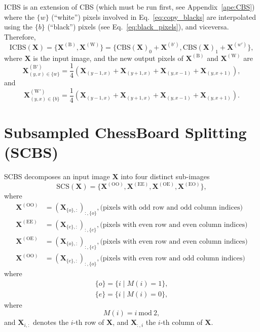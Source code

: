 \documentclass{article}
\begin{document}
ICBS is an extension of CBS (which must be run first, see
Appendix~\ref{ape:CBS}) where the $\{w\}$ (``white'') pixels involved
in Eq.~\ref{eq:copy_blacks} are interpolated using the $\{b\}$
(``black'') pixels (see Eq.~\ref{eq:black_pixels}), and
viceversa. Therefore,
\begin{equation}
  \mathrm{ICBS}(\mathbf{X})=\{\mathbf{X}^{(\text{B})},\mathbf{X}^{(\text{W})}\}=\{\text{CBS}(\mathbf{X})_0 + \mathbf{X}^{(b')},\text{CBS}(\mathbf{X})_1 + \mathbf{X}^{(w')}\},
\end{equation}
where $\mathbf{X}$ is the input image, and the new output pixels of
$\mathbf{X}^{(\text{B})}$ and $\mathbf{X}^{(\text{W})}$ are
\begin{equation}
  \mathbf{X}^{(\text{B}')}_{(y,x)\in\{w\}} = \frac{1}{4}(\mathbf{X}_{(y-1,x)}+\mathbf{X}_{(y+1,x)}+\mathbf{X}_{(y,x-1)}+\mathbf{X}_{(y,x+1)}),
\end{equation}
and
\begin{equation}
  \mathbf{X}^{(\text{W}')}_{(y,x)\in\{b\}} = \frac{1}{4}(\mathbf{X}_{(y-1,x)}+\mathbf{X}_{(y+1,x)}+\mathbf{X}_{(y,x-1)}+\mathbf{X}_{(y,x+1)}).
\end{equation}


\section{Subsampled ChessBoard Splitting (SCBS)}
\label{ape:SCBS}

SCBS \cite{koho2019fourier} decomposes an input image $\mathbf{X}$
into four distinct sub-images
\begin{equation}
  \mathrm{SCS}(\mathbf{X}) = \{\mathbf{X}^{(\text{OO})}, \mathbf{X}^{(\text{EE})}, \mathbf{X}^{(\text{OE})}, \mathbf{X}^{(\text{EO})} \},
\end{equation}
where
\begin{align}
  \mathbf{X}^{(\text{OO})} & = (\mathbf{X}_{\{o\},:})_{:,\{o\}}, \text{(pixels with odd row and odd column indices)} \\
  \mathbf{X}^{(\text{EE})} & = (\mathbf{X}_{\{e\},:})_{:,\{e\}}, \text{(pixels with even row and even column indices)}\\
  \mathbf{X}^{(\text{OE})} & = (\mathbf{X}_{\{o\},:})_{:,\{e\}}, \text{(pixels with even row and even column indices)}\\
  \mathbf{X}^{(\text{OO})} & = (\mathbf{X}_{\{e\},:})_{:,\{o\}}, \text{(pixels with even row and odd column indices)}
\end{align}
where
\begin{align}
  \{o\} = \{i\mid M(i)=1\}, \\
  \{e\} = \{i\mid M(i)=0\},
\end{align}
where
\begin{equation}
  M(i) = i~\text{mod}~2,
\end{equation}
and $\mathbf{X}_{i,:}$ denotes the $i$-th row of $\mathbf{X}$, and
$\mathbf{X}_{:,i}$ the $i$-th column of $\mathbf{X}$.
\end{document}
